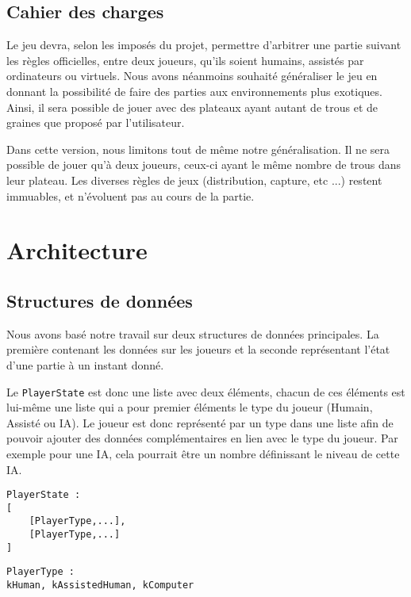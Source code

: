 \documentclass[]{article}
\begin{document}
\subsection{Cahier des charges}

Le jeu devra, selon les imposés du projet, permettre d'arbitrer une partie suivant les règles officielles, entre deux joueurs, qu'ils soient humains, assistés par ordinateurs ou virtuels. Nous avons néanmoins souhaité généraliser le jeu en donnant la possibilité de faire des parties aux environnements plus exotiques. Ainsi, il sera possible de jouer avec des plateaux ayant autant de trous et de graines que proposé par l'utilisateur. 

Dans cette version, nous limitons tout de même notre généralisation. Il ne sera possible de jouer qu'à deux joueurs, ceux-ci ayant le même nombre de trous dans leur plateau. Les diverses règles de jeux (distribution, capture, etc ...) restent immuables, et n'évoluent pas au cours de la partie.

\section{Architecture}

\subsection{Structures de données}

	Nous avons basé notre travail sur deux structures de données principales. La première contenant les données sur les joueurs et la seconde représentant l'état d'une partie à un instant donné.

Le \texttt{PlayerState} est donc une liste avec deux éléments, chacun de ces éléments est lui-même une liste qui a pour premier éléments le type du joueur (Humain, Assisté ou IA).
Le joueur est donc représenté par un type dans une liste afin de pouvoir ajouter des données complémentaires en lien avec le type du joueur. Par exemple pour une IA, cela pourrait être un nombre définissant le niveau de cette IA.

\begin{verbatim}
PlayerState : 
[
    [PlayerType,...],
    [PlayerType,...]
]
\end{verbatim}

\begin{verbatim}
PlayerType :
kHuman, kAssistedHuman, kComputer
\end{verbatim}
\end{document}
